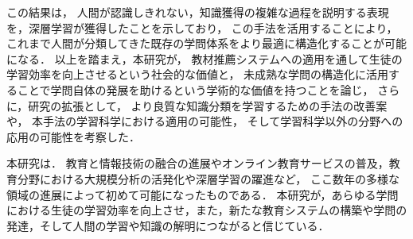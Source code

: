 この結果は，
人間が認識しきれない，知識獲得の複雑な過程を説明する表現を，深層学習が獲得したことを示しており，
この手法を活用することにより，これまで人間が分類してきた既存の学問体系をより最適に構造化することが可能になる．
以上を踏まえ，本研究が，
教材推薦システムへの適用を通して生徒の学習効率を向上させるという社会的な価値と，
未成熟な学問の構造化に活用することで学問自体の発展を助けるという学術的な価値を持つことを論じ，
さらに，研究の拡張として，
より良質な知識分類を学習するための手法の改善案や，
本手法の学習科学における適用の可能性，
そして学習科学以外の分野への応用の可能性を考察した．


本研究は．
教育と情報技術の融合の進展やオンライン教育サービスの普及，教育分野における大規模分析の活発化や深層学習の躍進など，
ここ数年の多様な領域の進展によって初めて可能になったものである．
本研究が，あらゆる学問における生徒の学習効率を向上させ，また，新たな教育システムの構築や学問の発達，そして人間の学習や知識の解明につながると信じている．
